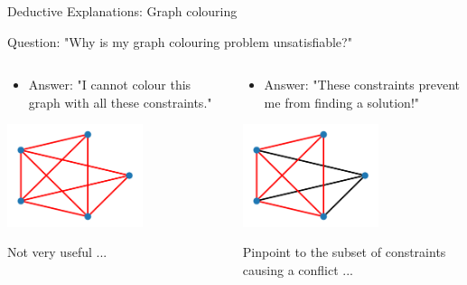 \documentclass{cons-beamer}
\begin{document}
\begin{frame}{Deductive Explanations: Graph colouring}
  \begin{center}
    Question: "Why is my graph colouring problem unsatisfiable?"
  \end{center}
  \begin{columns}
    \begin{column}{0.5\textwidth}
      \begin{itemize}
        \item Answer: "I cannot colour this graph with all these constraints."
      \end{itemize}
      \begin{center}
        \includegraphics[height=30mm]{images/texpl_img/graph_all_cons_red.png}
      \end{center}

      Not very useful ...
      \vfill
    \end{column}    
    \begin{column}{0.5\textwidth}
      \begin{itemize}  
        \item Answer: "These constraints prevent me from finding a solution!"
      \end{itemize}
      \begin{center}
        \includegraphics[height=30mm]{images/texpl_img/graph_mus_red.png}
      \end{center}

      Pinpoint to the subset of constraints causing a conflict ... 
    \end{column}    
  \end{columns}
\end{frame}
\end{document}
